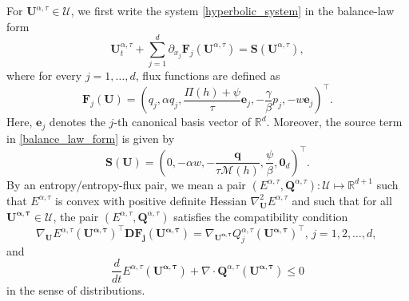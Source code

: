 \documentclass[11pt]{article}
\numberwithin{equation}{section}
\newtheorem{counter example}[theorem]{Counter Example}
\numberwithin{equation}{section}
\numberwithin{equation}{section}
\newcommand{\rel}{^{\alpha, \tau}}
\begin{document}
For $\mathbf{U}\rel\in \mathcal{U}$, we first write the system \eqref{hyperbolic_system} in the balance-law form
\begin{equation}\label{balance_law_form}
    \mathbf{U}\rel_t
    +\sum_{j=1}^{d}
    \partial_{x_j}\mathbf{F}_j(\mathbf{U}\rel)
    =\mathbf{S}(\mathbf{U}\rel),
\end{equation}
where for every $j=1,\ldots,d$, flux functions are defined as
\[
\mathbf{F}_j(\mathbf{U} )
=
\left(
q_j ,
\alpha q_j ,
\frac{\Pi(h )+\psi }{\tau}\mathbf e_j,
-\frac{\gamma}{\beta}p_j ,
-w \mathbf e_j
\right)^\top.
\]
Here, $\mathbf e_j$ denotes the $j$-th canonical basis vector
of $\mathbb R^d$. Moreover, the source term in \eqref{balance_law_form} is given by
\[
\mathbf{S}(\mathbf{U} )
=
\left(
0,
-\alpha w ,
-\frac{\mathbf q }{\tau\mathcal M(h )},
\frac{\psi }{\beta},
\mathbf 0_d
\right)^\top.
\]
By an entropy/entropy-flux pair, we mean a pair 
$(E\rel, \mathbf{Q}\rel): \mathcal{U}\mapsto \mathbb{R}^{d+1}$ such that $E\rel$ is convex  with positive definite Hessian $\nabla^2_{{\mathbf U}} E\rel$ and such that for all $\mathbf{U\rel}\in \mathcal{U}$, the pair $(E\rel, \mathbf{Q}\rel)$ satisfies the compatibility condition
\begin{equation}\label{entropy}
\nabla_{\mathbf{U}} E\rel(\mathbf{U\rel})^\top\mathbf{DF_j(U\rel)}=\nabla_{\mathbf{U\rel}}Q_j\rel(\mathbf{U\rel})^\top, \, j=1, 2, \ldots, d,\,
\end{equation}
and
 \begin{equation}\label{entropy_dissipation}
\dfrac{d}{dt}E\rel(\mathbf{U\rel})+\nabla\cdot \mathbf{Q}\rel(\mathbf{U\rel})\leq 0
\end{equation}
in the sense of distributions.
\end{document}
